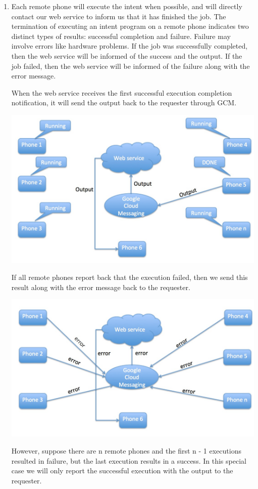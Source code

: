 \documentclass{acm_proc_article-sp}
\begin{document}
\begin{enumerate}
\item Each remote phone will execute the intent when possible, and will directly contact our web service to inform us that it has finished the job.  The termination of executing an intent program on a remote phone indicates two distinct types of results: successful completion and failure.  Failure may involve errors like hardware problems.   If the job was successfully completed, then the web service will be informed of the success and the output.  If the job failed, then the web service will be informed of the failure along with the error message.

When the web service receives the first successful execution completion notification, it will send the output back to the requester through GCM. 

\includegraphics[scale=0.45]{s4a.jpg}

If all remote phones report back that the execution failed, then we send this result along with the error message back to the requester.

\includegraphics[scale=0.45]{s4b.jpg}

However, suppose there are n remote phones and the first n - 1 executions resulted in failure, but the last execution results in a success.  In this special case we will only report the successful execution with the output to the requester.

\end{enumerate}
\end{document}
